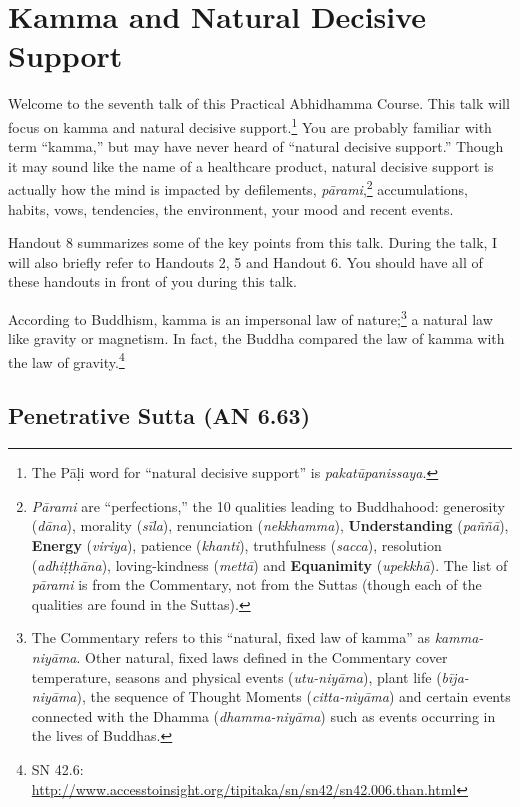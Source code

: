 \section{Kamma and Natural Decisive Support}

Welcome to the seventh talk of this Practical Abhidhamma Course. This talk will focus on kamma and natural decisive support.\footnote{The Pāḷi word for “natural decisive support” is \textit{pakatūpanissaya}.} You are probably familiar with term “kamma,” but may have never heard of “natural decisive support.” Though it may sound like the name of a healthcare product, natural decisive support is actually how the mind is impacted by defilements, \textit{pārami},\footnote{\textit{Pārami} are “perfections,” the 10 qualities leading to Buddhahood: generosity (\textit{dāna}), morality (\textit{sīla}), renunciation (\textit{nekkhamma}), \textbf{Understanding} (\textit{paññā}), \textbf{Energy} (\textit{viriya}), patience (\textit{khanti}), truthfulness (\textit{sacca}), resolution (\textit{adhiṭṭhāna}), loving-kindness (\textit{mettā}) and \textbf{Equanimity} (\textit{upekkhā}). The list of \textit{pārami} is from the Commentary, not from the Suttas (though each of the qualities are found in the Suttas).} accumulations, habits, vows, tendencies, the environment, your mood and recent events.

Handout 8 summarizes some of the key points from this talk. During the talk, I will also briefly refer to Handouts 2, 5 and Handout 6. You should have all of these handouts in front of you during this talk.

According to Buddhism, kamma is an impersonal law of nature;\footnote{The Commentary refers to this “natural, fixed law of kamma” as \textit{kamma-niyāma}. Other natural, fixed laws defined in the Commentary cover temperature, seasons and physical events (\textit{utu-niyāma}), plant life (\textit{bīja-niyāma}), the sequence of Thought Moments (\textit{citta-niyāma}) and certain events connected with the Dhamma (\textit{dhamma-niyāma}) such as events occurring in the lives of Buddhas.} a natural law like gravity or magnetism. In fact, the Buddha compared the law of kamma with the law of gravity.\footnote{SN 42.6: \url{http://www.accesstoinsight.org/tipitaka/sn/sn42/sn42.006.than.html}}

\subsection*{Penetrative Sutta (AN 6.63)}

